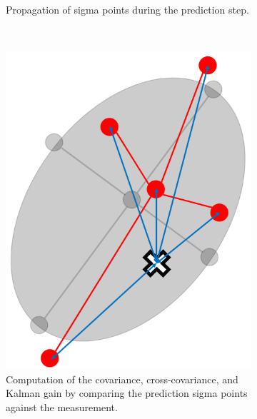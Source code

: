 \begin{figure}[h!]
\begin{subfigure}[r]{0.35\textwidth}
	\caption{Propagation of sigma points during the prediction step.}
	\label{fig:ukf2}
	\end{subfigure}
	\\
	\begin{subfigure}[b]{0.35\textwidth}
	\includegraphics[width=\linewidth]{./ukf3}
	\caption{Computation of the covariance, cross-covariance, and Kalman gain by comparing the prediction sigma points against the measurement.}
	\label{fig:ukf3}
	\end{subfigure}
		\hspace{0.04\textwidth}
	\begin{subfigure}[b]{0.35\textwidth}

\end{subfigure}
\end{figure}
